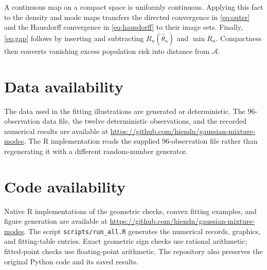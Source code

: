 \documentclass[12pt,a4paper]{article}
\theoremstyle{remark}
\begin{document}
A continuous map on a compact space is uniformly continuous. Applying this fact to the density and mode maps transfers the directed convergence in \eqref{eq:outer} and the Hausdorff convergence in \eqref{eq:hausdorff} to their image sets. Finally, \eqref{eq:gap} follows by inserting and subtracting $R_n(\widehat\theta_n)$ and $\min R_n$. Compactness then converts vanishing excess population risk into distance from $\mathcal A$.



\section*{Data availability}
The data used in the fitting illustrations are generated or deterministic. The 96-observation data file, the twelve deterministic observations, and the recorded numerical results are available at \url{https://github.com/hiendn/gaussian-mixture-modes}. The R implementation reads the supplied 96-observation file rather than regenerating it with a different random-number generator.

\section*{Code availability}
Native R implementations of the geometric checks, convex fitting examples, and figure generation are available at \url{https://github.com/hiendn/gaussian-mixture-modes}. The script \texttt{scripts/run\_all.R} generates the numerical records, graphics, and fitting-table entries. Exact geometric sign checks use rational arithmetic; fitted-point checks use floating-point arithmetic. The repository also preserves the original Python code and its saved results.


\end{document}

